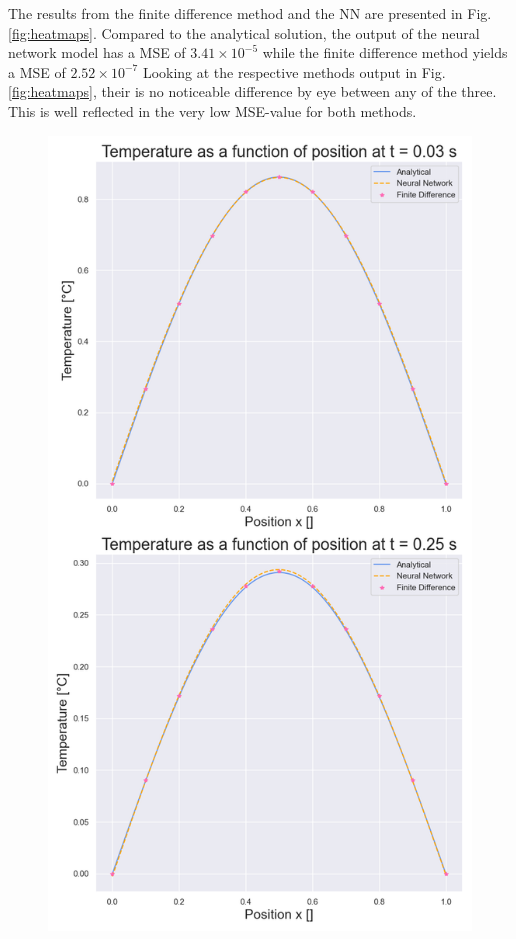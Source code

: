 The results from the finite difference method and the NN are presented in Fig. \ref{fig:heatmaps}.
Compared to the analytical solution, the output of the neural network model has a MSE of $ 3.41 \times 10^{-5}$ while the finite difference method yields a MSE of $2.52 \times 10^{-7}$
Looking at the respective methods output in Fig. \ref{fig:heatmaps}, their is no noticeable difference by eye between any of the three.  
This is well reflected in the very low MSE-value for both methods. 

\begin{figure}[h!]
    \centering
    \includegraphics[width=1.0\linewidth]{project_3/plots/time_slices_comparison.png}

\end{figure}
